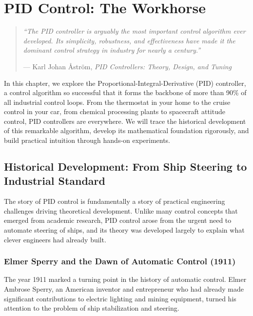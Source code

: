 
\chapter{PID Control: The Workhorse}

\begin{quote}
\textit{``The PID controller is arguably the most important control algorithm ever developed. Its simplicity, robustness, and effectiveness have made it the dominant control strategy in industry for nearly a century.''}
\begin{flushright}
--- Karl Johan \r{A}str\"om, \textit{PID Controllers: Theory, Design, and Tuning}
\end{flushright}
\end{quote}

\vspace{1em}

\noindent In this chapter, we explore the Proportional-Integral-Derivative (PID) controller, a control algorithm so successful that it forms the backbone of more than 90\% of all industrial control loops. From the thermostat in your home to the cruise control in your car, from chemical processing plants to spacecraft attitude control, PID controllers are everywhere. We will trace the historical development of this remarkable algorithm, develop its mathematical foundation rigorously, and build practical intuition through hands-on experiments.

\section{Historical Development: From Ship Steering to Industrial Standard}

The story of PID control is fundamentally a story of practical engineering challenges driving theoretical development. Unlike many control concepts that emerged from academic research, PID control arose from the urgent need to automate steering of ships, and its theory was developed largely to explain what clever engineers had already built.

\subsection{Elmer Sperry and the Dawn of Automatic Control (1911)}

The year 1911 marked a turning point in the history of automatic control. Elmer Ambrose Sperry, an American inventor and entrepreneur who had already made significant contributions to electric lighting and mining equipment, turned his attention to the problem of ship stabilization and steering.

